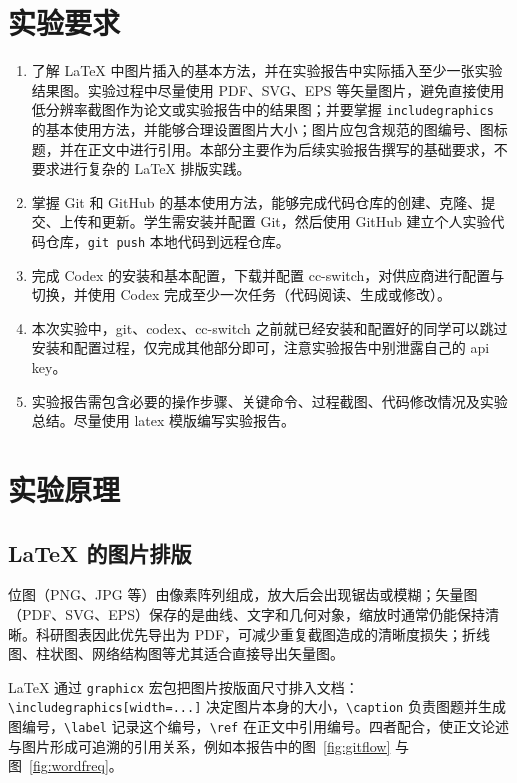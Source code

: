 \documentclass{SYSUReport}
\date{2026 年 9 月 24 日}
\begin{document}
\cover
\thispagestyle{empty}
\clearpage

\tableofcontents
\clearpage

\setcounter{page}{1}

\section{实验要求}

\begin{enumerate}
    \item 了解 LaTeX 中图片插入的基本方法，并在实验报告中实际插入至少一张实验结果图。实验过程中尽量使用 PDF、SVG、EPS 等矢量图片，避免直接使用低分辨率截图作为论文或实验报告中的结果图；并要掌握 \texttt{includegraphics} 的基本使用方法，并能够合理设置图片大小；图片应包含规范的图编号、图标题，并在正文中进行引用。本部分主要作为后续实验报告撰写的基础要求，不要求进行复杂的 LaTeX 排版实践。
    \item 掌握 Git 和 GitHub 的基本使用方法，能够完成代码仓库的创建、克隆、提交、上传和更新。学生需安装并配置 Git，然后使用 GitHub 建立个人实验代码仓库，\texttt{git push} 本地代码到远程仓库。
    \item 完成 Codex 的安装和基本配置，下载并配置 cc-switch，对供应商进行配置与切换，并使用 Codex 完成至少一次任务（代码阅读、生成或修改）。
    \item 本次实验中，git、codex、cc-switch 之前就已经安装和配置好的同学可以跳过安装和配置过程，仅完成其他部分即可，注意实验报告中别泄露自己的 api key。
    \item 实验报告需包含必要的操作步骤、关键命令、过程截图、代码修改情况及实验总结。尽量使用 latex 模版编写实验报告。
\end{enumerate}

\section{实验原理}

\subsection{LaTeX 的图片排版}

位图（PNG、JPG 等）由像素阵列组成，放大后会出现锯齿或模糊；矢量图（PDF、SVG、EPS）保存的是曲线、文字和几何对象，缩放时通常仍能保持清晰。科研图表因此优先导出为 PDF，可减少重复截图造成的清晰度损失；折线图、柱状图、网络结构图等尤其适合直接导出矢量图。

LaTeX 通过 \texttt{graphicx} 宏包把图片按版面尺寸排入文档：\texttt{\textbackslash includegraphics[width=...]} 决定图片本身的大小，\texttt{\textbackslash caption} 负责图题并生成图编号，\texttt{\textbackslash label} 记录这个编号，\texttt{\textbackslash ref} 在正文中引用编号。四者配合，使正文论述与图片形成可追溯的引用关系，例如本报告中的图~\ref{fig:gitflow} 与图~\ref{fig:wordfreq}。
\end{document}
